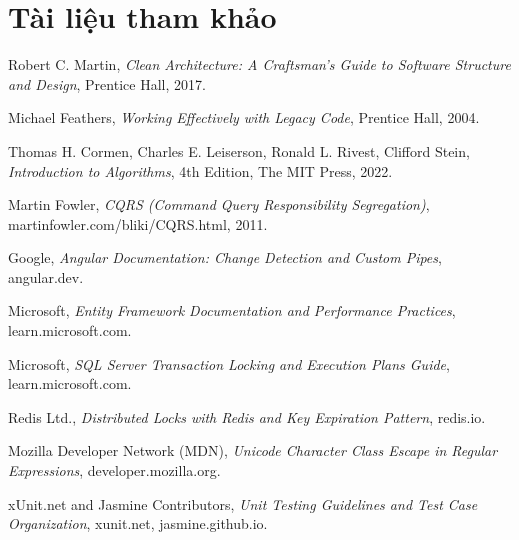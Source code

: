 \clearpage
\section*{Tài liệu tham khảo}

\begin{enumerate}[leftmargin=1.2cm, itemsep=2pt, topsep=3pt, parsep=0pt, label={[\arabic*]}]
\item Robert C. Martin, \textit{Clean Architecture: A Craftsman's Guide to Software Structure and Design}, Prentice Hall, 2017.
\item Michael Feathers, \textit{Working Effectively with Legacy Code}, Prentice Hall, 2004.
\item Thomas H. Cormen, Charles E. Leiserson, Ronald L. Rivest, Clifford Stein, \textit{Introduction to Algorithms}, 4th Edition, The MIT Press, 2022.
\item Martin Fowler, \textit{CQRS (Command Query Responsibility Segregation)}, martinfowler.com/bliki/CQRS.html, 2011.
\item Google, \textit{Angular Documentation: Change Detection and Custom Pipes}, angular.dev.
\item Microsoft, \textit{Entity Framework Documentation and Performance Practices}, learn.microsoft.com.
\item Microsoft, \textit{SQL Server Transaction Locking and Execution Plans Guide}, learn.microsoft.com.
\item Redis Ltd., \textit{Distributed Locks with Redis and Key Expiration Pattern}, redis.io.
\item Mozilla Developer Network (MDN), \textit{Unicode Character Class Escape in Regular Expressions}, developer.mozilla.org.
\item xUnit.net and Jasmine Contributors, \textit{Unit Testing Guidelines and Test Case Organization}, xunit.net, jasmine.github.io.
\end{enumerate}

\clearpage
